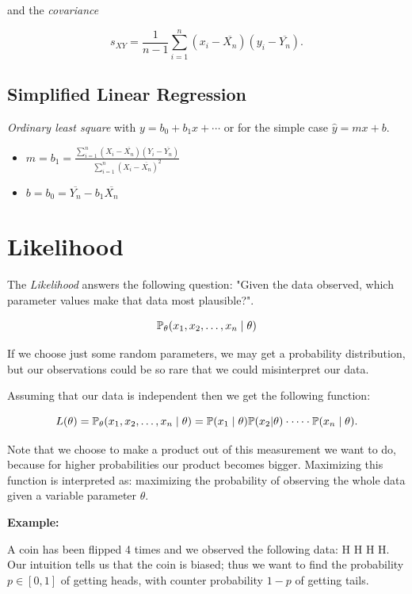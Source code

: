 and the \emph{covariance}

\[
    s_{XY} = \frac{1}{n - 1} \sum_{i = 1}^{n} (x_i - \overline{X_n})(y_i - \overline{Y_n}).
\]

\subsection{Simplified Linear Regression}

\emph{Ordinary least square} with \(y = b_0 + b_1 x + \cdots\) or for the simple case 
\(\hat{y} = mx + b\). 

\begin{itemize}

    \item \(m = b_1 = \frac{\sum_{i = 1}^{n}(X_i - \overline{X_n}) (Y_i - \overline{Y_n})}{\sum_{i = 1}^{n}(X_i - \overline{X_n})^2}\) 
    
    \item \(b = b_0 = \overline{Y_n} - b_1 \overline{X_n}\)

\end{itemize}

\section{Likelihood}

The \emph{Likelihood} answers the following question: "Given the data observed, which parameter values make that data most plausible?".

\[
    \mathbb{P}_{\theta}(x_1, x_2, \dots, x_n \mid \theta)
\]

If we choose just some random parameters, we may get a probability distribution, but our observations could be so rare that we could misinterpret our data.

Assuming that our data is independent then we get the following function: 

\[
    L(\theta) = \mathbb{P}_{\theta}(x_1, x_2, \dots, x_n \mid \theta) = \mathbb{P}(x_1 \mid \theta) \mathbb{P}(x_2 | \theta) \cdot \dots \cdot \mathbb{P}(x_n \mid \theta).
\]

Note that we choose to make a product out of this measurement we want to do, because for higher probabilities our product becomes bigger.
Maximizing this function is interpreted as: maximizing the probability of observing the whole data given a variable parameter \(\theta\).

\textbf{Example:}

A coin has been flipped 4 times and we observed the following data: H H H H. Our intuition tells us that the coin is biased; 
thus we want to find the probability \(p \in [0,1]\) of getting heads, with counter probability \(1 - p\) of getting tails. 

